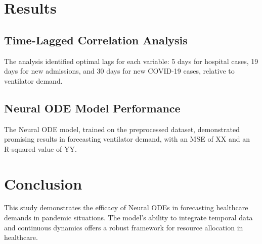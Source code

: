 \documentclass[lettersize, journal]{IEEEtran}
\begin{document}

\section{Results}
\subsection{Time-Lagged Correlation Analysis}
The analysis identified optimal lags for each variable: 5 days for hospital cases, 19 days for new admissions, and 30 days for new COVID-19 cases, relative to ventilator demand.

\subsection{Neural ODE Model Performance}
The Neural ODE model, trained on the preprocessed dataset, demonstrated promising results in forecasting ventilator demand, with an MSE of XX and an R-squared value of YY.

\section{Conclusion}
This study demonstrates the efficacy of Neural ODEs in forecasting healthcare demands in pandemic situations. The model's ability to integrate temporal data and continuous dynamics offers a robust framework for resource allocation in healthcare.


\end{document}
